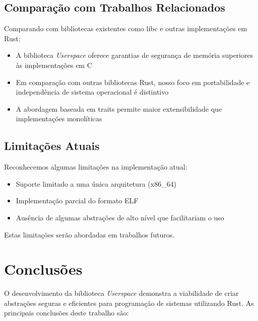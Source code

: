 \documentclass[12pt,a4paper]{article}
\begin{document}
\subsection{Comparação com Trabalhos Relacionados}

Comparando com bibliotecas existentes como libc e outras implementações em Rust:

\begin{itemize}
    \item A biblioteca \textit{Userspace} oferece garantias de segurança de memória superiores às implementações em C
    \item Em comparação com outras bibliotecas Rust, nosso foco em portabilidade e independência de sistema operacional é distintivo
    \item A abordagem baseada em traits permite maior extensibilidade que implementações monolíticas
\end{itemize}

\subsection{Limitações Atuais}

Reconhecemos algumas limitações na implementação atual:

\begin{itemize}
    \item Suporte limitado a uma única arquitetura (x86\_64)
    \item Implementação parcial do formato ELF
    \item Ausência de algumas abstrações de alto nível que facilitariam o uso
\end{itemize}

Estas limitações serão abordadas em trabalhos futuros.

\section{Conclusões}

O desenvolvimento da biblioteca \textit{Userspace} demonstra a viabilidade de criar abstrações seguras e eficientes para programação de sistemas utilizando Rust. As principais conclusões deste trabalho são:
\end{document}
